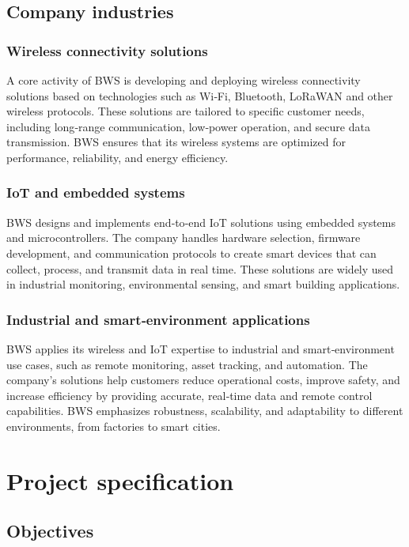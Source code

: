 \subsection{Company industries}
\subsubsection{Wireless connectivity solutions}
\hspace{1cm}
A core activity of BWS is developing and deploying wireless connectivity solutions based on technologies such as Wi‑Fi, Bluetooth, LoRaWAN and other wireless protocols. These solutions are tailored to specific customer needs, including long‑range communication, low‑power operation, and secure data transmission. BWS ensures that its wireless systems are optimized for performance, reliability, and energy efficiency.
\subsubsection{IoT and embedded systems}
\hspace{1cm}
BWS designs and implements end‑to‑end IoT solutions using embedded systems and microcontrollers. The company handles hardware selection, firmware development, and communication protocols to create smart devices that can collect, process, and transmit data in real time. These solutions are widely used in industrial monitoring, environmental sensing, and smart building applications.
\subsubsection{Industrial and smart‑environment applications}
\hspace{1cm}
BWS applies its wireless and IoT expertise to industrial and smart‑environment use cases, such as remote monitoring, asset tracking, and automation. The company’s solutions help customers reduce operational costs, improve safety, and increase efficiency by providing accurate, real‑time data and remote control capabilities. BWS emphasizes robustness, scalability, and adaptability to different environments, from factories to smart cities.

\section{Project specification}
\subsection{Objectives}

